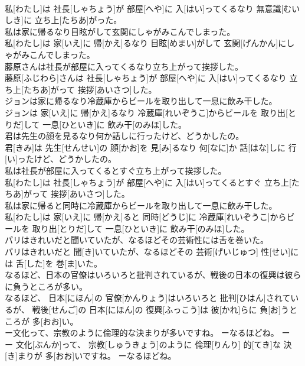 \documentclass[8pt]{extreport}
\begin{document}
\begin{CJK}{UTF8}{min}
\\	私[わたし]は 社長[しゃちょう]が 部屋[へや]に 入[はい]ってくるなり 無意識[むいしき]に 立ち上[たちあ]がった。
\\	私は家に帰るなり目眩がして玄関にしゃがみこんでしまった。	
\\	私[わたし]は 家[いえ]に 帰[かえ]るなり 目眩[めまい]がして 玄関[げんかん]にしゃがみこんでしまった。
\\	藤原さんは社長が部屋に入ってくるなり立ち上がって挨拶した。	
\\	藤原[ふじわら]さんは 社長[しゃちょう]が 部屋[へや]に 入[はい]ってくるなり 立ち上[たちあ]がって 挨拶[あいさつ]した。
\\	ジョンは家に帰るなり冷蔵庫からビールを取り出して一息に飲み干した。	
\\	ジョンは 家[いえ]に 帰[かえ]るなり 冷蔵庫[れいぞうこ]からビールを 取り出[とりだ]して 一息[ひといき]に 飲み干[のみほ]した。
\\	君は先生の顔を見るなり何か話しに行ったけど、どうかしたの。	
\\	君[きみ]は 先生[せんせい]の 顔[かお]を 見[み]るなり 何[なに]か 話[はな]しに 行[い]ったけど、どうかしたの。
\\	私は社長が部屋に入ってくるとすぐ立ち上がって挨拶した。	
\\	私[わたし]は 社長[しゃちょう]が 部屋[へや]に 入[はい]ってくるとすぐ 立ち上[たちあ]がって 挨拶[あいさつ]した。
\\	私は家に帰ると同時に冷蔵庫からビールを取り出して一息に飲み干した。	
\\	私[わたし]は 家[いえ]に 帰[かえ]ると 同時[どうじ]に 冷蔵庫[れいぞうこ]からビールを 取り出[とりだ]して 一息[ひといき]に 飲み干[のみほ]した。
\\	パリはきれいだと聞いていたが、なるほどその芸術性には舌を巻いた。	
\\	パリはきれいだと 聞[き]いていたが、なるほどその 芸術[げいじゅつ] 性[せい]には 舌[した]を 巻[ま]いた。
\\	なるほど、日本の官僚はいろいろと批判されているが、戦後の日本の復興は彼らに負うところが多い。	
\\	なるほど、 日本[にほん]の 官僚[かんりょう]はいろいろと 批判[ひはん]されているが、 戦後[せんご]の 日本[にほん]の 復興[ふっこう]は 彼[かれ]らに 負[お]うところが 多[おお]い。
\\	ー文化って、宗教のように倫理的な決まりが多いですね。 ーなるほどね。	ー
\\	ー 文化[ぶんか]って、 宗教[しゅうきょう]のように 倫理[りんり] 的[てき]な 決[き]まりが 多[おお]いですね。 ーなるほどね。

\end{CJK}
\end{document}
